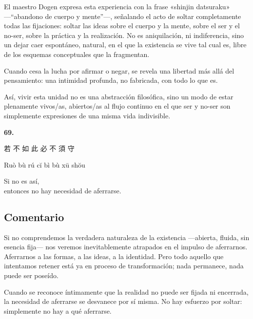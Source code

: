 \documentclass[
  a5paperpaper,
]{article}
\begin{document}
El maestro Dogen expresa esta experiencia con la frase «shinjin
datsuraku» ---``abandono de cuerpo y mente''---, señalando el acto de
soltar completamente todas las fijaciones: soltar las ideas sobre el
cuerpo y la mente, sobre el ser y el no-ser, sobre la práctica y la
realización. No es aniquilación, ni indiferencia, sino un dejar caer
espontáneo, natural, en el que la existencia se vive tal cual es, libre
de los esquemas conceptuales que la fragmentan.

Cuando cesa la lucha por afirmar o negar, se revela una libertad más
allá del pensamiento: una intimidad profunda, no fabricada, con todo lo
que es.

Así, vivir esta unidad no es una abstracción filosófica, sino un modo de
estar plenamente vivos/as, abiertos/as al flujo continuo en el que ser y
no-ser son simplemente expresiones de una misma vida indivisible.

\hfill\break

\hypertarget{04}{}
\begin{verseblock}

\newpage

\begin{center}\textbf{69.}\end{center}

若 不 如 此 必 不 須 守

Ruò bù rú cĭ bì bù xū shŏu

Si no es así,\\
entonces no hay necesidad de aferrarse.

\end{verseblock}

\hfill\break

\hypertarget{comentario-68}{%
\subsection{Comentario}\label{comentario-68}}

Si no comprendemos la verdadera naturaleza de la existencia ---abierta,
fluida, sin esencia fija--- nos veremos inevitablemente atrapados en el
impulso de aferrarnos. Aferrarnos a las formas, a las ideas, a la
identidad. Pero todo aquello que intentamos retener está ya en proceso
de transformación; nada permanece, nada puede ser poseído.

Cuando se reconoce íntimamente que la realidad no puede ser fijada ni
encerrada, la necesidad de aferrarse se desvanece por sí misma. No hay
esfuerzo por soltar: simplemente no hay a qué aferrarse.
\end{document}
